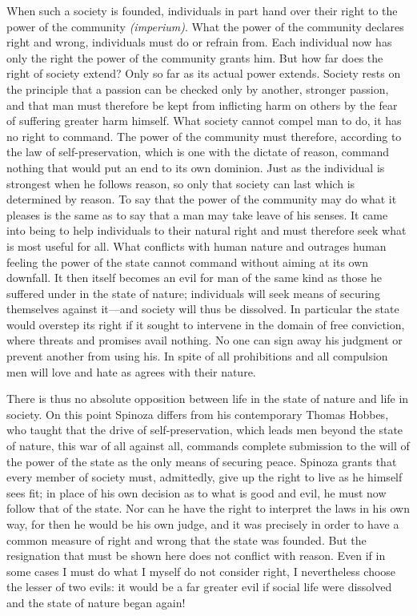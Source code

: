 \documentclass[12pt]{book}
\newcommand{\opage}[1]{\marginnote{\footnotesize\textit{[#1]}}}
\begin{document}
When such a society is founded, individuals in part hand over their right to the power of
the community \textit{(imperium)}. What the power of the community declares right and
wrong, individuals must do or refrain from. Each individual now has only the right the
power of the community grants him. But how far does the right of society extend? Only so
far as its actual power extends. Society rests on the principle that a passion can be
checked only by another, stronger passion, and that man must therefore be kept from
inflicting harm on others by the fear of suffering greater harm himself. What society
\opage{150}cannot compel man to do, it has no right to command. The power of the
community must therefore, according to the law of self-preservation, which is one with
the dictate of reason, command nothing that would put an end to its own dominion. Just as
the individual is strongest when he follows reason, so only that society can last which
is determined by reason. To say that the power of the community may do what it pleases is
the same as to say that a man may take leave of his senses. It came into being to help
individuals to their natural right and must therefore seek what is most useful for all.
What conflicts with human nature and outrages human feeling the power of the state cannot
command without aiming at its own downfall. It then itself becomes an evil for man of the
same kind as those he suffered under in the state of nature; individuals will seek means
of securing themselves against it---and society will thus be dissolved. In particular the
state would overstep its right if it sought to intervene in the domain of free
conviction, where threats and promises avail nothing. No one can sign away his judgment
or prevent another from using his. In spite of all prohibitions and all compulsion men
will love and hate as agrees with their nature.

There is thus no absolute opposition between life in the state of nature and life in
society. On this point Spinoza differs from his contemporary Thomas Hobbes, who taught
that the drive of self-preservation, which leads men beyond the state of nature, this war
of all against all, commands complete submission \opage{151}to the will of the power of
the state as the only means of securing peace. Spinoza grants that every member of society
must, admittedly, give up the right to live as he himself sees fit; in place of his own
decision as to what is good and evil, he must now follow that of the state. Nor can he
have the right to interpret the laws in his own way, for then he would be his own judge,
and it was precisely in order to have a common measure of right and wrong that the state
was founded. But the resignation that must be shown here does not conflict with reason.
Even if in some cases I must do what I myself do not consider right, I nevertheless
choose the lesser of two evils: it would be a far greater evil if social life were
dissolved and the state of nature began again!
\end{document}
